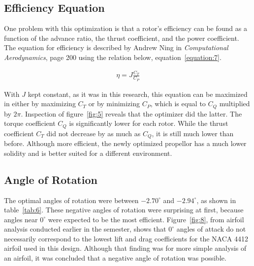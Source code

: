 \documentclass[journal ]{new-aiaa}
\begin{document}
\subsection{Efficiency Equation}

One problem with this optimization is that a rotor's efficiency can be found as a function of the advance ratio, the thrust coefficient, and the power coefficient. The equation for efficiency is described by Andrew Ning in \emph{Computational Aerodynamics}, page 200 \cite{ComAer} using the relation below, equation~\eqref{equation:7}.

\begin{equation}
	\begin{aligned}
	\label{equation:7}
	\eta = J \frac{C_{T}}{C_{P}}
	\end{aligned}
\end{equation}

With $J$ kept constant, as it was in this research, this equation can be maximized in either by maximizing $C_{T}$ or by minimizing $C_{P}$, which is equal to $C_{Q}$ multiplied by $2 \pi$. Inspection of figure~\eqref{fig:5} reveals that the optimizer did the latter. The torque coefficient $C_{Q}$ is significantly lower for each rotor. While the thrust coefficient $C_{T}$ did not decrease by as much as $C_{Q}$, it is still much lower than before. Although more efficient, the newly optimized propellor has a much lower solidity and is better suited for a different environment.

\subsection{Angle of Rotation}

The optimal angles of rotation were between $-2.70^{\circ}$ and $-2.94^{\circ}$, as shown in table~\eqref{tab:6}. These negative angles of rotation were surprising at first, because angles near $0^{\circ}$ were expected to be the most efficient. Figure~\eqref{fig:8}, from airfoil analysis conducted earlier in the semester, shows that $0^{\circ}$ angles of attack do not necessarily correspond to the lowest lift and drag coefficients for the NACA 4412 airfoil used in this design. Although that finding was for more simple analysis of an airfoil, it was concluded that a negative angle of rotation was possible.
\end{document}
